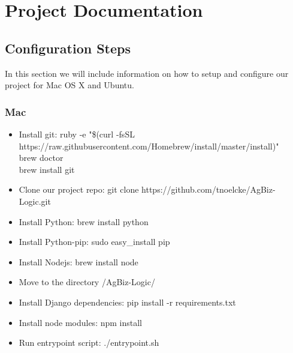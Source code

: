 \documentclass[onecolumn, draftclsnofoot,10pt, compsoc]{article}
\begin{document}
\section{Project Documentation}
    \subsection{Configuration Steps}
        In this section we will include information on how to setup and configure our project for Mac OS X and Ubuntu.
        \subsubsection{Mac}
            \begin{itemize}
                \item Install git: ruby -e "\$(curl -fsSL https://raw.githubusercontent.com/Homebrew/install/master/install)" \\
                brew doctor \\
                brew install git \\
                \item Clone our project repo: git clone https://github.com/tnoelcke/AgBiz-Logic.git 
                \item Install Python: brew install python
                \item Install Python-pip: sudo easy\_install pip
                \item Install Nodejs: brew install node
                \item Move to the directory /AgBiz-Logic/
                \item Install Django dependencies: pip install -r requirements.txt
                \item Install node modules: npm install
                \item Run entrypoint script: ./entrypoint.sh
            \end{itemize}
\end{document}

